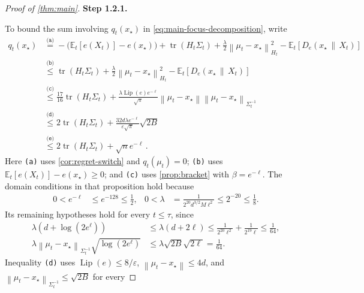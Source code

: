 \documentclass[11pt]{article}
\newcommand{\proofstepinline}[1]{%
    {\sffamily\bfseries\color{blue!55!black}Step #1.}\enspace
}
\newcommand{\reason}[1]{\texttt{(#1)}}
\newcommand{\explan}[2]{\stackrel{\reason{#2}}{#1}}
\newcommand{\E}{\mathbb E}
\newcommand{\tr}{\operatorname{tr}}
\newcommand{\Lip}{\operatorname{Lip}}
\newcommand{\1}{\mathbf 1}
\newcommand{\eps}{\varepsilon}
\newcommand{\norm}[1]{\left\lVert #1\right\rVert}
\newcommand{\normm}[2]{\left\lVert #1\right\rVert_{#2}}
\begin{document}
\begin{proof}[Proof of \cref{thm:main}]
    \proofstepinline{1.2.1}
    To bound the sum involving $q_t(x_\star)$ in
    \eqref{eq:main-focus-decomposition}, write
    \begin{align}
        q_t(x_\star)
         &
        \explan{=}{a}
        -\bigl(\E_t[e(X_t)]-e(x_\star)\bigr)
        +\tr(H_t\Sigma_t)
        +\frac\lambda2\normm{\mu_t-x_\star}{H_t}^2
        -\E_t[D_e(x_\star\,\|\,X_t)]         \\
         &
        \explan{\leq}{b}
        \tr(H_t\Sigma_t)
        +\frac\lambda2\normm{\mu_t-x_\star}{H_t}^2
        -\E_t[D_e(x_\star\,\|\,X_t)]         \\
         &
        \explan{\leq}{c}
        \frac{17}{16}\tr(H_t\Sigma_t)
        +\frac{\lambda\Lip(e)e^{-\ell}}{\sqrt\pi}
        \norm{\mu_t-x_\star}
        \normm{\mu_t-x_\star}{\Sigma_t^{-1}} \\
         &
        \explan{\leq}{d}
        2\tr(H_t\Sigma_t)
        +\frac{32d \lambda e^{-\ell}}{\eps\sqrt\pi}
        \sqrt{2B}
        \\
         & \explan{\leq}{e}
        2\tr(H_t\Sigma_t)
        + \sqrt{n}e^{-\ell}\,.
        \label{eq:main-q-upper}
    \end{align}
    Here \reason{a} uses \cref{cor:regret-switch} and
    $q_t(\mu_t)=0$;
    \reason{b} uses
    $\E_t[e(X_t)]-e(x_\star)\geq0$;
    and \reason{c} uses \cref{prop:bracket} with $\beta=e^{-\ell}$.
    The domain conditions in that proposition hold because
    \begin{align}
        0<e^{-\ell}
         & \leq e^{-128}\leq\frac12,
         &
        0<\lambda
         & =\frac{1}{2^{20}d^{3/2}M\ell^2}
        \leq2^{-20}\leq\frac18.
    \end{align}
    Its remaining hypotheses hold for every $t\leq\tau$, since
    \begin{align}
        \lambda\left(d+\log(2e^\ell)\right)
         & \leq
        \lambda\left(d+2\ell\right)
        \leq
        \frac{1}{2^{20}\ell^2}
        +\frac{1}{2^{19}\ell}
        \leq\frac1{64},
        \label{eq:main-stability-bracket-scale}
        \\
        \lambda
        \normm{\mu_t-x_\star}{\Sigma_t^{-1}}
        \sqrt{\log(2e^\ell)}
         & \leq
        \lambda\sqrt{2B}\sqrt{2\ell}
        =\frac1{64}.
        \label{eq:main-stability-bracket-focus}
    \end{align}
    Inequality \reason{d} uses
    $\Lip(e)\leq8/\eps$, $\norm{\mu_t-x_\star}\leq4d$, and
    $\normm{\mu_t-x_\star}{\Sigma_t^{-1}}\leq\sqrt{2B}$ for every

\end{proof}
\end{document}
